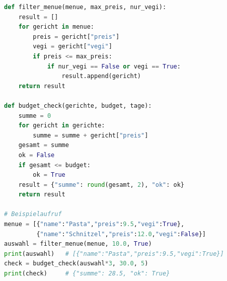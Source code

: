 \begin{myexercise}
	\begin{myanswer}
		\begin{lstlisting}[language=Python]
def filter_menue(menue, max_preis, nur_vegi):
    result = []
    for gericht in menue:
        preis = gericht["preis"]
        vegi = gericht["vegi"]
        if preis <= max_preis:
            if nur_vegi == False or vegi == True:
                result.append(gericht)
    return result

def budget_check(gerichte, budget, tage):
    summe = 0
    for gericht in gerichte:
        summe = summe + gericht["preis"]
    gesamt = summe
    ok = False
    if gesamt <= budget:
        ok = True
    result = {"summe": round(gesamt, 2), "ok": ok}
    return result

# Beispielaufruf
menue = [{"name":"Pasta","preis":9.5,"vegi":True},
         {"name":"Schnitzel","preis":12.0,"vegi":False}]
auswahl = filter_menue(menue, 10.0, True)
print(auswahl)   # [{"name":"Pasta","preis":9.5,"vegi":True}]
check = budget_check(auswahl*3, 30.0, 5)
print(check)     # {"summe": 28.5, "ok": True}
\end{lstlisting}
	\end{myanswer}
\end{myexercise}
